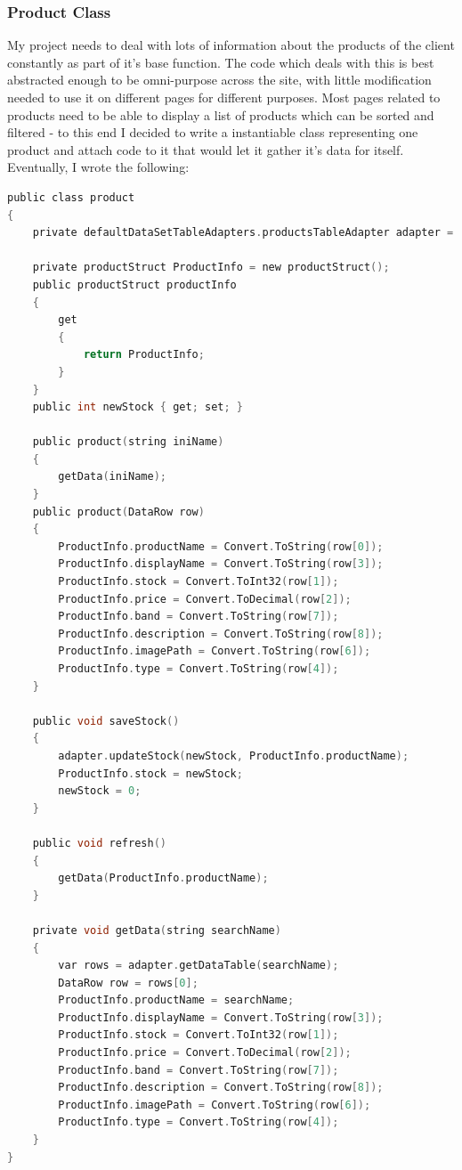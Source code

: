 ﻿\documentclass{article}
\begin{document}
    \subsubsection{Product Class}
    My project needs to deal with lots of information about the products of the client constantly as part of it's base function.
    The code which deals with this is best abstracted enough to be omni-purpose across the site, with little modification needed to use it on different pages for different purposes.
    Most pages related to products need to be able to display a list of products which can be sorted and filtered - to this end I decided to write a instantiable class representing one product and attach code to it that would let it gather it's data for itself.
    Eventually, I wrote the following:
    \begin{lstlisting}[language=C]
public class product
{
    private defaultDataSetTableAdapters.productsTableAdapter adapter = new defaultDataSetTableAdapters.productsTableAdapter();

    private productStruct ProductInfo = new productStruct();
    public productStruct productInfo
    {
        get
        {
            return ProductInfo;
        }
    }
    public int newStock { get; set; }

    public product(string iniName)
    {
        getData(iniName);
    }
    public product(DataRow row)
    {
        ProductInfo.productName = Convert.ToString(row[0]);
        ProductInfo.displayName = Convert.ToString(row[3]);
        ProductInfo.stock = Convert.ToInt32(row[1]);
        ProductInfo.price = Convert.ToDecimal(row[2]);
        ProductInfo.band = Convert.ToString(row[7]);
        ProductInfo.description = Convert.ToString(row[8]);
        ProductInfo.imagePath = Convert.ToString(row[6]);
        ProductInfo.type = Convert.ToString(row[4]);
    }
    
    public void saveStock()
    {
        adapter.updateStock(newStock, ProductInfo.productName);
        ProductInfo.stock = newStock;
        newStock = 0;
    }

    public void refresh()
    {
        getData(ProductInfo.productName);
    }

    private void getData(string searchName)
    {
        var rows = adapter.getDataTable(searchName);
        DataRow row = rows[0];
        ProductInfo.productName = searchName;
        ProductInfo.displayName = Convert.ToString(row[3]);
        ProductInfo.stock = Convert.ToInt32(row[1]);
        ProductInfo.price = Convert.ToDecimal(row[2]);
        ProductInfo.band = Convert.ToString(row[7]);
        ProductInfo.description = Convert.ToString(row[8]);
        ProductInfo.imagePath = Convert.ToString(row[6]);
        ProductInfo.type = Convert.ToString(row[4]);
    }
}
    \end{lstlisting}
\end{document}
